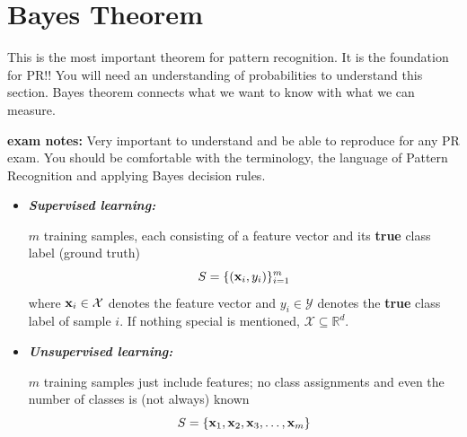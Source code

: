 
\section{Bayes Theorem}

This is the most important theorem for pattern recognition. It is the foundation for PR!! You will need an understanding of probabilities to understand this section.
Bayes theorem connects what we want to know with what we can measure. \autocite{duda2001}

\noindent
\textbf{exam notes:} Very important to understand and be able to reproduce for any PR exam. You should be comfortable with the terminology, the language of Pattern Recognition and applying Bayes decision rules. 
\begin{itemize}
		\item {\em \textbf{Supervised learning:}}

		      $m$ training samples, each consisting of a feature vector and its \textbf{true} class label (ground truth)
		      \begin{displaymath}
			      S = \{(\bm{\mathrm{x}}_i, y_i)\}_{i=1}^m
		      \end{displaymath}
              where $\bm{\mathrm{x}}_i \in \mathcal{X}$ denotes the feature vector and $y_i\in\mathcal{Y}$ denotes the \textbf{true} class label of sample $i$.
	      If nothing special is mentioned, ${\mathcal{X}}\subseteq \mathbb{R}^d$.

		\item {\em \textbf{Unsupervised learning:}}

		      $m$ training samples just include features; no class assignments and even the number of classes is (not always) known
		      \begin{displaymath}
			      S = \{ \bm{\mathrm{x}}_1, \bm{\mathrm{x}}_2, \bm{\mathrm{x}}_3, \dots, \bm{\mathrm{x}}_m \}
		      \end{displaymath}
	\end{itemize}
	
